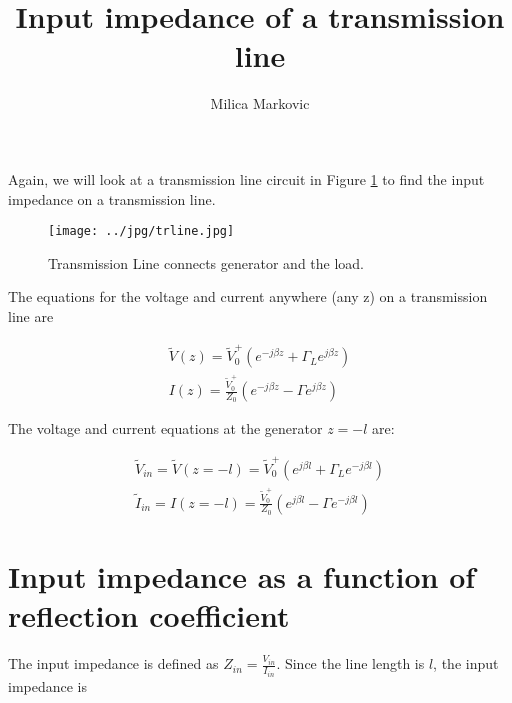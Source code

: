 \documentclass{ximera}
\title{Input impedance of a transmission line}
\author{Milica Markovic}
\begin{document}
  
\begin{abstract}  

\end{abstract}  
\maketitle    



Again, we will look at a transmission line circuit in Figure \ref{fig:IITRLine} to find the input impedance on a transmission line.

\begin{figure}[htbp]
\begin{center}
\texttt{[image: ../jpg/trline.jpg]}
\end{center}
\caption{Transmission Line connects generator and the load.}
\label{fig:IITRLine}
\end{figure}




The equations for the voltage and current anywhere (any z) on a transmission line  are


\begin{eqnarray}
\tilde{V}(z)= \tilde{V}_0^+ (e^{-j \beta z} + \Gamma_L  e^{j \beta z }  ) \label{eq:vtlfin} \\
I(z)=   \frac{\tilde{V}_0^+}{Z_0}  (e^{-j \beta z} - \Gamma  e^{j \beta z}  ) \label{eq:itlfin}
\end{eqnarray}


The voltage and current equations at the generator $z=-l$ are:

\begin{eqnarray}
\tilde{V}_{in}=\tilde{V}(z=-l)= \tilde{V}_0^+ (e^{j \beta l} + \Gamma_L  e^{-j \beta l }  )  \\
\tilde{I}_{in}=I(z=-l)=   \frac{\tilde{V}_0^+}{Z_0}  (e^{j \beta l} - \Gamma  e^{-j \beta l}  ) 
\end{eqnarray}


\section{Input impedance as a function of reflection coefficient}

The input impedance is defined as $Z_{in}=\frac{V_{in}}{I_{in}}$. Since the line length is $l$, the input impedance is
\end{document}
